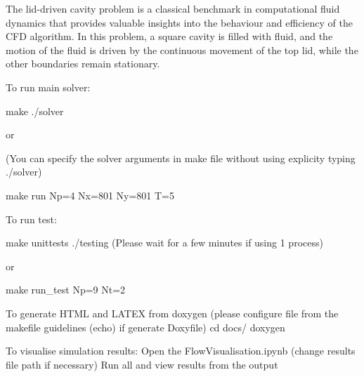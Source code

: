 The lid-\/driven cavity problem is a classical benchmark in computational fluid dynamics that provides valuable insights into the behaviour and efficiency of the CFD algorithm. In this problem, a square cavity is filled with fluid, and the motion of the fluid is driven by the continuous movement of the top lid, while the other boundaries remain stationary.

To run main solver\+:
\begin{DoxyEnumerate}
\item make ./solver
\end{DoxyEnumerate}

or

(You can specify the solver arguments in make file without using explicity typing ./solver)
\begin{DoxyEnumerate}
\item make run Np=4 Nx=801 Ny=801 T=5
\end{DoxyEnumerate}

To run test\+:
\begin{DoxyEnumerate}
\item make unittests ./testing (Please wait for a few minutes if using 1 process)
\end{DoxyEnumerate}

or


\begin{DoxyEnumerate}
\item make run\+\_\+test Np=9 Nt=2
\end{DoxyEnumerate}

To generate HTML and LATEX from doxygen (please configure file from the makefile guidelines (echo) if generate Doxyfile) cd docs/ doxygen

To visualise simulation results\+: Open the Flow\+Visualisation.\+ipynb (change results file path if necessary) Run all and view results from the output 